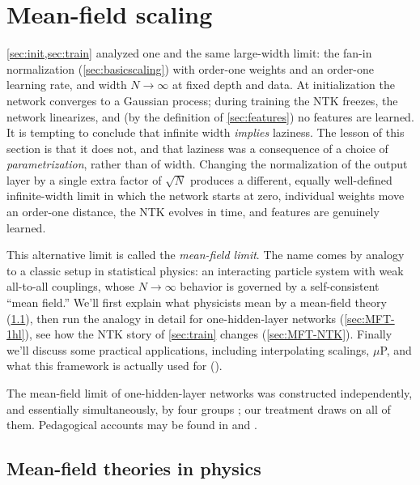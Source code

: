 \documentclass[11pt]{article}
\begin{document}
\section{Mean-field scaling}
\label{sec:MFT}

\cref{sec:init,sec:train} analyzed one and the same large-width limit: the fan-in normalization (\cref{sec:basicscaling}) with order-one weights and an order-one learning rate, and width $N\to\infty$ at fixed depth and data. At initialization the network converges to a Gaussian process; during training the NTK freezes, the network linearizes, and (by the definition of \cref{sec:features}) no features are learned. It is tempting to conclude that infinite width \emph{implies} laziness. The lesson of this section is that it does not, and that laziness was a consequence of a choice of \emph{parametrization}, rather than of width. Changing the normalization of the output layer by a single extra factor of $\sqrt N$ produces a different, equally well-defined infinite-width limit in which the network starts at zero, individual weights move an order-one distance, the NTK evolves in time, and features are genuinely learned.

This alternative limit is called the \emph{mean-field limit}. The name comes by analogy to a classic setup in statistical physics: an interacting particle system with weak all-to-all couplings, whose $N\to\infty$ behavior is governed by a self-consistent ``mean field.''
We'll first explain what physicists mean by a mean-field theory (\cref{sec:MFT-physics}), then run the analogy in detail for one-hidden-layer networks (\cref{sec:MFT-1hl}), see how the NTK story of \cref{sec:train} changes (\cref{sec:MFT-NTK}).
Finally we'll discuss some practical applications, including interpolating scalings, $\mu$P, and what this framework is actually used for ().

The mean-field limit of one-hidden-layer networks was constructed independently, and essentially simultaneously, by four groups \cite{mei2018mean,chizat2018global,rotskoff2022trainability,sirignano2020mean}; our treatment draws on all of them. Pedagogical accounts may be found in \cite[Ch. 20]{spiliopoulos2025foundations} and \cite[Lecture 4]{hanin2026mdl}.




\subsection{Mean-field theories in physics}
\label{sec:MFT-physics}
\end{document}
